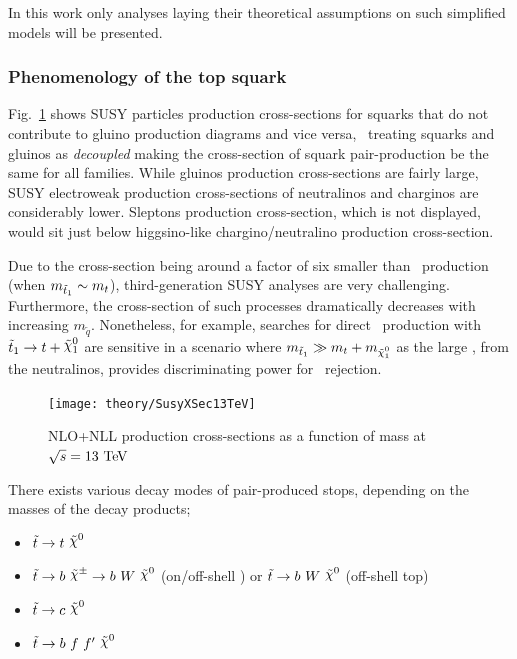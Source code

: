 				In this work only analyses laying their theoretical assumptions on such simplified models will be presented. 

			\subsubsection*{Phenomenology of the top squark}

				Fig.~\ref{fig:susy_13TeV_xsec} shows SUSY particles production cross-sections for squarks that do not contribute to gluino production diagrams and vice versa, \ie\ treating squarks and gluinos as \textit{decoupled} making the cross-section of squark pair-production be the same for all families. While gluinos production cross-sections are fairly large, SUSY electroweak production cross-sections of neutralinos and charginos are considerably lower. Sleptons production cross-section, which is not displayed, would sit just below higgsino-like chargino/neutralino production cross-section. 

				Due to the cross-section being around a factor of six smaller than \ttbar\ production (when $m_{\tilde{t}_1} \sim m_t$), third-generation SUSY analyses are very challenging. Furthermore, the cross-section of such processes dramatically decreases with increasing $m_{\tilde{q}}$. Nonetheless, for example, searches for direct \stopone\ production with $\stopone \ra t + \ninoone$ are sensitive in a scenario where $m_{\stopone} \gg m_t + m_{\ninoone}$ as the large \met, from the neutralinos, provides discriminating power for \ttbar\ rejection.

				\begin{figure}[!htb]
					\centering
					\texttt{[image: theory/SusyXSec13TeV]}
					\caption{\label{fig:susy_13TeV_xsec} NLO+NLL production cross-sections as a function of mass at $\sqrt{s} = 13 \TeV$~\cite{Borschensky:2014cia}}
				\end{figure}

				There exists various decay modes of pair-produced stops, depending on the masses of the decay products; 

				\begin{itemize}
					\item $\stop \ra t\ \nino$
					\item $\stop \ra b\ \chinopm \ra b\  W\  \nino$ (on/off-shell \Wboson) or $\stop \ra b\  W\  \nino$ (off-shell top)
					\item $\stop \ra c\ \nino$
					\item $\stop \ra b\ f\ f'\ \nino$
				\end{itemize} 

